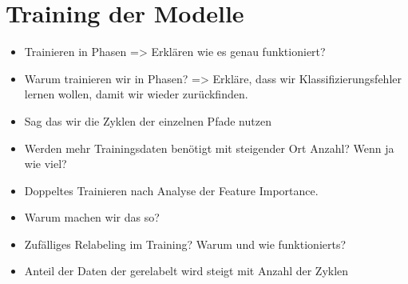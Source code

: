 \section{Training der Modelle}
\begin{itemize}
    \item Trainieren in Phasen => Erklären wie es genau funktioniert?
    \item Warum trainieren wir in Phasen? => Erkläre, dass wir Klassifizierungsfehler lernen wollen, damit wir wieder zurückfinden.
    \item Sag das wir die Zyklen der einzelnen Pfade nutzen
    \item Werden mehr Trainingsdaten benötigt mit steigender Ort Anzahl? Wenn ja wie viel?
    \item Doppeltes Trainieren nach Analyse der Feature Importance.
    \item Warum machen wir das so?
    \item Zufälliges Relabeling im Training? Warum und wie funktionierts?
    \item Anteil der Daten der gerelabelt wird steigt mit Anzahl der Zyklen
\end{itemize}

